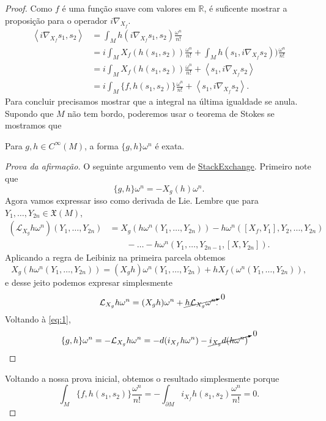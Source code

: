 \begin{proof}\leavevmode
Como $f$ é uma função suave com valores em $\mathbb{R}$, é suficente mostrar a proposição para o operador $i\nabla_{X_f}$.
\begin{align*}
\left<i\nabla_{X_f}s_1,s_2\right>&=\int_{M}h(i \nabla_{X_f}s_1,s_2)\frac{\omega^n}{n!}\\
&=i \int_{M}X_f(h(s_1,s_2))\frac{\omega^n}{n!}+\int_{M}h(s_1,i\nabla_{X_f}s_2))\frac{\omega^n}{n!}\\
&=i \int_{M}X_f(h(s_1,s_2))\frac{\omega^n}{n!}+\left<s_1,i\nabla_{X_f}s_2\right>\\
&=i \int_{M}\{f,h(s_1,s_2)\}\frac{\omega^n}{n!}+\left<s_1,i \nabla_{X_f}s_2\right>.
\end{align*}
Para concluir precisamos mostrar que a integral na última igualdade se anula. Supondo que $M$  não tem bordo, poderemos usar o teorema de Stokes se mostramos que
\begin{claim}\leavevmode
	Para $g,h \in C^\infty(M)$, a forma $\{g,h\}\omega^n$ é exata.
\end{claim}
\begin{proof}[Prova da afirmação]\leavevmode
O seguinte argumento vem de \href{https://math.stackexchange.com/questions/3532438/integral-of-poisson-bracket-vanishes}{StackExchange}. Primeiro note que
\begin{equation}\label{eq:1}
\{g,h\}\omega^n = -X_g(h)\omega^n.
\end{equation}
Agora vamos expressar isso como derivada de Lie. Lembre que para $Y_1,\ldots,Y_{2n}\in \mathfrak{X}(M)$,
\begin{align*}
	\left(\mathcal{L}_{X_g}h\omega^n\right)(Y_1,\ldots,Y_{2n})&=X_g\left( h \omega^n\left( Y_1,\ldots,Y_{2n} \right)  \right) -h \omega^n\left( [X_f,Y_1],Y_2,\ldots,Y_{2n} \right) \\
								  &  \qquad -\ldots-h \omega^n\left( Y_1,\ldots,Y_{2n-1},[X,Y_{2n}] \right).
\end{align*}
Aplicando a regra de Leibiniz na primeira parcela obtemos
\[X_g\left( h \omega^n\left( Y_1,\ldots,Y_{2n} \right)  \right)=(X_gh)\omega^n(Y_1,\ldots,Y_{2n})+hX_f\left( \omega^n(Y_1,\ldots,Y_{2n}) \right), \]
e desse jeito podemos expresar simplesmente
\[\mathcal{L}_{X_g}h\omega^n=(X_gh)\omega^n+\cancelto{0}{h\mathcal{L}_{X_g}\omega^n}.\]
Voltando à \cref{eq:1},
\begin{align*}
\{g,h\}\omega^n&=-\mathcal{L}_{X_g}h \omega^n=-d(i_{X_f}h\omega^n)-\cancelto{0}{i_{X_g}d(h \omega^n)}
\end{align*}
\end{proof}
Voltando a nossa prova inicial, obtemos o resultado simplesmente porque
\[\int_{M}\{f,h(s_1,s_2)\}\frac{\omega^n}{n!}=-\int_{\partial M}i_{X_f}h(s_1,s_2)\frac{\omega^n}{n!}=0.\]
\end{proof}

